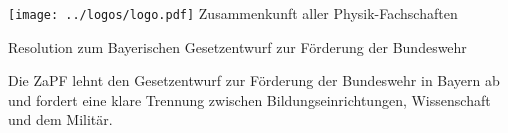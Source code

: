 \documentclass[DIV=calc]{scrartcl}
\begin{document}
\hspace{0.87\textwidth}
\begin{minipage}{120pt}
	\vspace{-1.8cm}
	\texttt{[image: ../logos/logo.pdf]}
	\centering
	\small Zusammenkunft aller Physik-Fachschaften
\end{minipage}

\begin{center}
  \huge{Resolution zum Bayerischen Gesetzentwurf zur Förderung der Bundeswehr}\vspace{.25\baselineskip}\\
  \normalsize
\end{center}
\vspace{1cm}






Die ZaPF lehnt den Gesetzentwurf zur Förderung der Bundeswehr in Bayern ab und fordert eine klare Trennung zwischen Bildungseinrichtungen, Wissenschaft und dem Militär.
\end{document}
